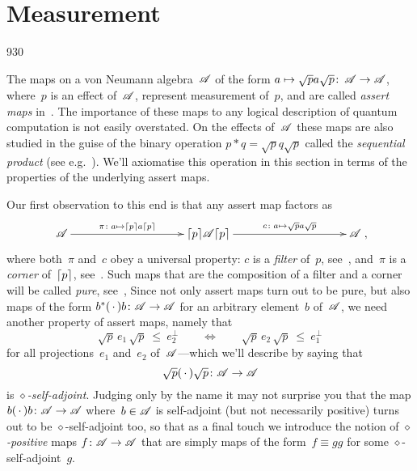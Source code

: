\section{Measurement}
\label{S:measurement}
\begin{parsec}{930}%
\begin{point}{10}%
The maps on a von Neumann algebra~$\mathscr{A}$
of the form
$a\mapsto \sqrt{p}a\sqrt{p}\colon\,\mathscr{A}\to\mathscr{A}$,
where~$p$ is an effect of~$\mathscr{A}$,
represent measurement of~$p$,
and are called \emph{assert maps} in~\cite{newdirections}.
The importance of these maps 
to any logical description of
quantum computation is not easily overstated.
On the effects of~$\mathscr{A}$
these maps are also  studied 
in the guise
of the binary operation
$p\ast q=\sqrt{p} q \sqrt{p}$
called the \emph{sequential product}
(see e.g.~\cite{gudder2002sequential}).
We'll axiomatise this operation
in this section
in terms of the properties 
of the underlying assert maps.

Our first observation
to this end
is that any assert map factors as
\begin{equation*}
\xymatrix@C=10em{
\scrA
\ar[r]^-{\pi\colon a\mapsto \ceil{p}a\ceil{p}}
&
\ceil{p}\!\scrA\!\ceil{p}
\ar[r]^-{c\colon a\mapsto \sqrt{p}a\sqrt{p}}
&
\scrA
},
\end{equation*}
where both~$\pi$ and~$c$ obey a universal property:
$c$ is a \emph{filter} of~$p$, see~,
and~$\pi$ is a \emph{corner} of~$\left\lceil p\right\rceil$, see~.
Such maps
that are the composition of a filter and a corner
will be called \emph{pure}, see~,
Since not only assert maps turn out to be pure, but also maps of the form
$b^*(\,\cdot\,)b\colon \mathscr{A}\to\mathscr{A}$ for an arbitrary element~$b$
of~$\mathscr{A}$,
we need another property of assert maps, namely
that
\begin{equation*}
	\sqrt{p}\,e_1\,\sqrt{p}\ \leq\  e_2^\perp 
	\qquad\iff\qquad
	\sqrt{p}\,e_2 \,\sqrt{p}\ \leq\  e_1^\perp
\end{equation*}
for all projections~$e_1$ and~$e_2$ of~$\mathscr{A}$---which we'll
describe by saying that 
	\begin{equation*} \sqrt{p}(\,\cdot\,)\sqrt{p}\colon \mathscr{A}\to\mathscr{A}
	\end{equation*}
is \emph{$\diamond$-self-adjoint}.
Judging only by the name
it may not surprise you that the map $b(\,\cdot\,)b\colon \mathscr{A}\to\mathscr{A}$
where~$b\in \mathscr{A}$ is self-adjoint (but not necessarily positive)
turns out to be $\diamond$-self-adjoint too,
so that as a final touch we introduce the notion
of \emph{$\diamond$-positive} maps $f\colon \mathscr{A}\to\mathscr{A}$
that are simply maps of the form~$f\equiv gg$ for some $\diamond$-self-adjoint~$g$.


\end{point}
\end{parsec}
